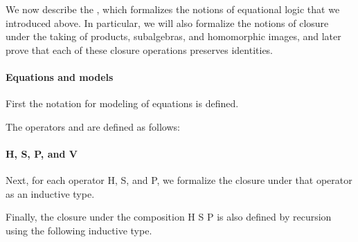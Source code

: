 \documentclass[a4paper,USenglish,cleveref,autoref,thm-restate]{lipics-v2019}
\begin{document}
We now describe the \closuremodule, which formalizes the notions of equational logic that we introduced above.
In particular, we will also formalize the notions of closure under the taking of products, subalgebras, and homomorphic images, and later prove that each of these closure operations preserves identities.

\paragraph*{Equations and models}
First the notation for modeling of equations is defined.
\begin{code}\end{code}
The operators  and  are defined as follows:
\begin{code}\end{code}

\paragraph*{H, S, P, and V}
Next, for each operator \AF H, \AF S, and \AF P, we formalize the closure under that operator as an inductive type.
\begin{code}\end{code}
Finally, the closure under the composition \AF H \AF S \AF P is also defined by recursion using the following inductive type.
\begin{code}\end{code}
\end{document}
